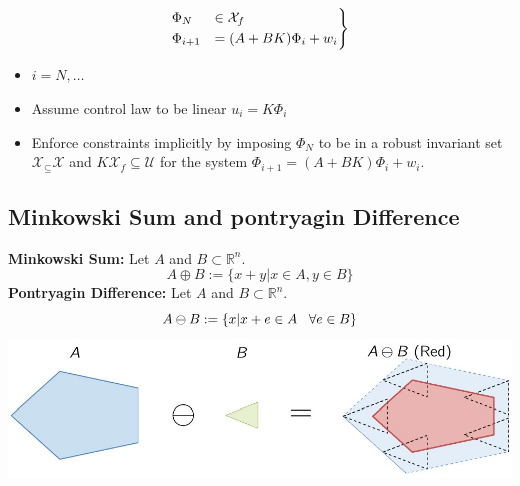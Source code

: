      \begin{minipage}{0.22\linewidth}
        \begin{align*}
        \begin{rcases}
            \Phi_N &\in \mathcal{X}_f\\
            \Phi_{i+1} &= (A+BK)\Phi _i+w_i
        \end{rcases}
        \end{align*}
    \end{minipage}
    \begin{minipage}{0.6\linewidth}
         \begin{itemize}
             \item $i=N,\dots$
             \item Assume control law to be linear $u_i=K\Phi_i$
             \item Enforce constraints implicitly by imposing $\Phi_N$ to be in a robust invariant set $\mathcal{X}_\subseteq \mathcal{X}$ and $K\mathcal{X}_f \subseteq\mathcal{U}$ for the system $\Phi_{i+1} = (A+BK)\Phi_i+w_i$.
         \end{itemize}
    \end{minipage}
    \subsection{Minkowski Sum and pontryagin Difference}
    \textbf{Minkowski Sum:} Let $A$ and $B\subset\mathbb{R}^n$. 
    \[A\oplus B := \{x+y | x \in A,y\in B\}\]
    \textbf{Pontryagin Difference:} Let $A$ and $B\subset\mathbb{R}^n$. 
     \[A\ominus B := \{x|x+e\in A \hspace{3mm}\forall e \in B\}\]
     \includegraphics[width=0.9\linewidth]{MPC_summary/Images/PontryaginDiff.jpg}